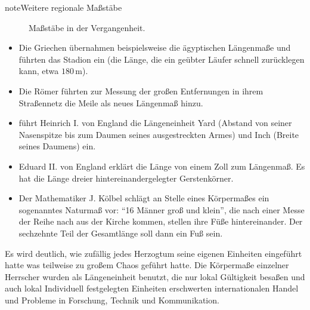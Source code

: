 \documentclass[letterpaper,10pt,english]{jupyterBook}
\let\sphinxpxdimen\pdfpxdimen\else\newdimen\sphinxpxdimen
\begin{document}
\begin{sphinxadmonition}{note}{Weitere regionale Maßstäbe}

\begin{figure}[H]
\centering
\capstart

\noindent\sphinxincludegraphics[width=400\sphinxpxdimen]{{massstab}.png}
\caption{Maßstäbe in der Vergangenheit.}\label{\detokenize{content/1_Messen_Einheit:massstab}}\end{figure}
\begin{itemize}
\item {} 
\sphinxAtStartPar
Die Griechen übernahmen beispielsweise die ägyptischen Längenmaße und führten das Stadion ein (die Länge, die ein geübter Läufer schnell zurücklegen kann, etwa \(180\,\mathrm m\)).

\item {} 
\sphinxAtStartPar
Die Römer führten zur Messung der großen Entfernungen in ihrem Straßennetz die Meile als neues Längenmaß hinzu.

\item {} 
 führt Heinrich I. von England die Längeneinheit Yard (Abstand von seiner Nasenspitze bis zum Daumen seines ausgestreckten Armes) und Inch (Breite seines Daumens) ein.

\item {} 
\sphinxAtStartPar
Eduard II. von England erklärt die Länge von einem Zoll zum Längenmaß. Es hat die Länge dreier hintereinandergelegter Gerstenkörner.

\item {} 
\sphinxAtStartPar
Der Mathematiker J. Kölbel schlägt an Stelle eines Körpermaßes ein sogenanntes Naturmaß vor: “16 Männer groß und klein”, die nach einer Messe der Reihe nach aus der Kirche kommen, stellen ihre Füße hintereinander. Der sechzehnte Teil der Gesamtlänge soll dann ein Fuß sein.

\end{itemize}
\end{sphinxadmonition}

\sphinxAtStartPar
Es wird deutlich, wie zufällig jedes Herzogtum seine eigenen Einheiten eingeführt hatte was teilweise zu großem Chaos geführt hatte.
Die Körpermaße einzelner Herrscher wurden als Längeneinheit benutzt, die nur lokal Gültigkeit besaßen und auch lokal Individuell festgelegten Einheiten erschwerten internationalen Handel und Probleme in Forschung, Technik und Kommunikation.
\end{document}
